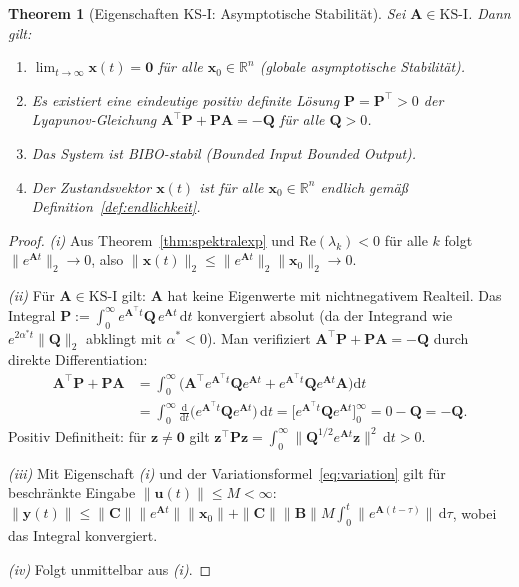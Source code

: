 \documentclass[a4paper, 12pt, twoside, openright]{report}
\newtheorem{theorem}{Theorem}[section]
\theoremstyle{definition}
\theoremstyle{definition}
\newcommand{\R}{\mathbb{R}}
\newcommand{\vx}{\bm{x}}
\newcommand{\vu}{\bm{u}}
\newcommand{\vy}{\bm{y}}
\newcommand{\vA}{\bm{A}}
\newcommand{\vB}{\bm{B}}
\newcommand{\vC}{\bm{C}}
\newcommand{\vP}{\bm{P}}
\newcommand{\vQ}{\bm{Q}}
\newcommand{\T}{\top}
\newcommand{\re}{\mathrm{Re}}
\newcommand{\KS}{\mathrm{KS}}
\begin{document}
\begin{theorem}[Eigenschaften KS-I: Asymptotische Stabilität]
\label{thm:ks1}
Sei $\vA \in \KS\text{-I}$. Dann gilt:
\begin{enumerate}[label=(\roman*)]
  \item $\lim_{t\to\infty}\vx(t) = \bm{0}$ für alle $\vx_0 \in \R^n$
    (globale asymptotische Stabilität).
  \item Es existiert eine eindeutige positiv definite Lösung $\vP = \vP^\T > 0$
    der Lyapunov-Gleichung $\vA^\T\vP + \vP\vA = -\vQ$ für alle $\vQ > 0$.
  \item Das System ist BIBO-stabil (Bounded Input Bounded Output).
  \item Der Zustandsvektor $\vx(t)$ ist für alle $\vx_0 \in \R^n$ endlich
    gemäß Definition~\ref{def:endlichkeit}.
\end{enumerate}
\end{theorem}

\begin{proof}
\textit{(i)} Aus Theorem~\ref{thm:spektralexp} und $\re(\lambda_k) < 0$ für alle $k$
folgt $\|e^{\vA t}\|_2 \to 0$, also $\|\vx(t)\|_2 \leq \|e^{\vA t}\|_2 \|\vx_0\|_2 \to 0$.

\textit{(ii)} Für $\vA \in \KS\text{-I}$ gilt: $\vA$ hat keine Eigenwerte mit
nichtnegativem Realteil. Das Integral
$\vP := \int_0^\infty e^{\vA^\T t}\vQ\,e^{\vA t}\,\mathrm{d}t$
konvergiert absolut (da der Integrand wie $e^{2\alpha^* t}\|\vQ\|_2$ abklingt mit
$\alpha^* < 0$). Man verifiziert $\vA^\T\vP + \vP\vA = -\vQ$ durch direkte Differentiation:
\begin{align*}
  \vA^\T\vP + \vP\vA &= \int_0^\infty \bigl(\vA^\T e^{\vA^\T t}\vQ e^{\vA t} + e^{\vA^\T t}\vQ e^{\vA t}\vA\bigr)\mathrm{d}t \\
  &= \int_0^\infty \frac{\mathrm{d}}{\mathrm{d}t}\bigl(e^{\vA^\T t}\vQ e^{\vA t}\bigr)\,\mathrm{d}t
   = \bigl[e^{\vA^\T t}\vQ e^{\vA t}\bigr]_0^\infty = 0 - \vQ = -\vQ.
\end{align*}
Positiv Definitheit: für $\bm{z} \neq \bm{0}$ gilt
$\bm{z}^\T\vP\bm{z} = \int_0^\infty \|{\vQ}^{1/2}e^{\vA t}\bm{z}\|^2\,\mathrm{d}t > 0$.

\textit{(iii)} Mit Eigenschaft \textit{(i)} und der Variationsformel~\eqref{eq:variation}
gilt für beschränkte Eingabe $\|\vu(t)\| \leq M < \infty$:
$\|\vy(t)\| \leq \|\vC\|\|e^{\vA t}\|\|\vx_0\| + \|\vC\|\|\vB\| M \int_0^t \|e^{\vA(t-\tau)}\|\,\mathrm{d}\tau$,
wobei das Integral konvergiert.

\textit{(iv)} Folgt unmittelbar aus \textit{(i)}. \qedhere
\end{proof}
\end{document}
